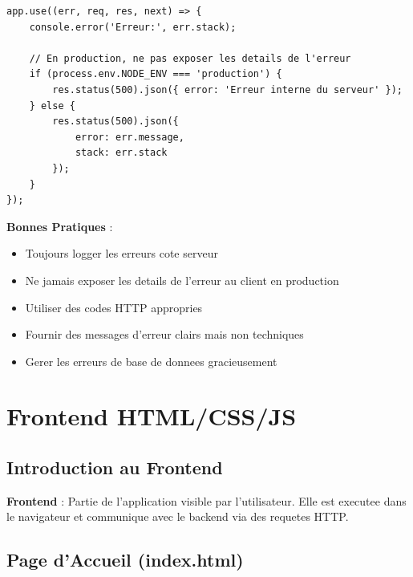 \documentclass[a4paper,12pt]{book}
\begin{document}
\begin{lstlisting}[style=javascript, caption=Middleware d'erreur global]
app.use((err, req, res, next) => {
    console.error('Erreur:', err.stack);

    // En production, ne pas exposer les details de l'erreur
    if (process.env.NODE_ENV === 'production') {
        res.status(500).json({ error: 'Erreur interne du serveur' });
    } else {
        res.status(500).json({
            error: err.message,
            stack: err.stack
        });
    }
});
\end{lstlisting}

\begin{bestpracticebox}
    \textbf{Bonnes Pratiques} :
    \begin{itemize}
        \item Toujours logger les erreurs cote serveur
        \item Ne jamais exposer les details de l'erreur au client en production
        \item Utiliser des codes HTTP appropries
        \item Fournir des messages d'erreur clairs mais non techniques
        \item Gerer les erreurs de base de donnees gracieusement
    \end{itemize}
\end{bestpracticebox}

\chapter{Frontend HTML/CSS/JS}

\section{Introduction au Frontend}

\begin{definitionbox}
    \textbf{Frontend} : Partie de l'application visible par l'utilisateur. Elle est executee dans le navigateur et communique avec le backend via des requetes HTTP.
\end{definitionbox}

\section{Page d'Accueil (index.html)}
\end{document}
